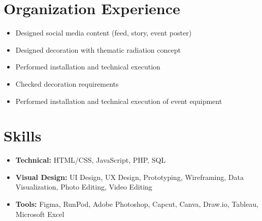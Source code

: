 \section*{Organization Experience}

\begin{itemize}
  \item Designed social media content (feed, story, event poster)
\end{itemize}

\begin{itemize}
  \item Designed decoration with thematic radiation concept
  \item Performed installation and technical execution
\end{itemize}

\begin{itemize}
  \item Checked decoration requirements
  \item Performed installation and technical execution of event equipment
\end{itemize}

\section*{Skills}

\begin{itemize}
  \item \textbf{Technical:} HTML/CSS, JavaScript, PHP, SQL
  \item \textbf{Visual Design:} UI Design, UX Design, Prototyping, Wireframing, Data Visualization, Photo Editing, Video Editing
  \item \textbf{Tools:} Figma, RunPod, Adobe Photoshop, Capcut, Canva, Draw.io, Tableau, Microsoft Excel
\end{itemize}
